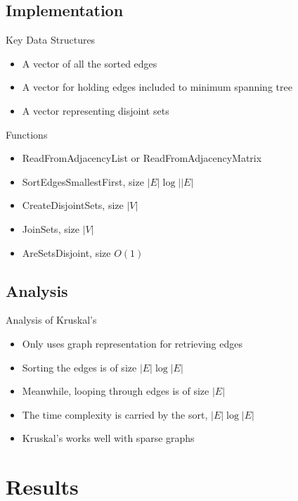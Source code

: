 \documentclass{beamer}
\begin{document}
\subsection{Implementation}
\begin{frame}{Key Data Structures}
    \begin{itemize}
    \item A vector of all the sorted edges
    \item A vector for holding edges included to minimum spanning tree
    \item A vector representing disjoint sets
    \end{itemize}
\end{frame}

\begin{frame}{Functions}
    \begin{itemize}
    \item ReadFromAdjacencyList or ReadFromAdjacencyMatrix
    \item SortEdgesSmallestFirst, size $|E|\log||E|$
    \item CreateDisjointSets, size $|V|$
    \item JoinSets, size $|V|$
    \item AreSetsDisjoint, size $O(1)$
    \end{itemize}
\end{frame}

\subsection{Analysis}
\begin{frame}{Analysis of Kruskal's}
    \begin{itemize}
    \item Only uses graph representation for retrieving edges
    \item Sorting the edges is of size $|E|\log|E|$
    \item Meanwhile, looping through edges is of size $|E|$
    \item The time complexity is carried by the sort, $|E|\log|E|$
    \item Kruskal's works well with sparse graphs
    \end{itemize}   
\end{frame}


\section{Results}\frame{\sectionpage}
\end{document}
